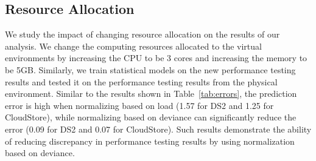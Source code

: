 \begin{comment}
\begin{table}[tbh]
	\centering
	\caption{Discrepancy vs. Change in Virtual Environment}
	\label{my-label}
	\resizebox{\columnwidth}{!}{%
		\begin{tabular}{|c||c|c|}
			\hline
			\multirow{2}{*}{\textbf{Type}} & \multicolumn{2}{c|}{\textbf{MAPE}} \\ \cline{2-3} 
			& \textbf{CloudStore} & \textbf{DS2} \\ %
			\midrule
			\midrule
			Internal validation & 3.65\% & 10.52\% \\ \hline
			External validation with virtual repeated test \# 1 & 6.04\% & 11.69\% \\ \hline
			External validation with virtual repeated test \# 2 & 5.43\% & 15.48\% \\ \hline
			VMWare & 10.18\% & 12.89\% \\ \hline
			Change in resources & 25.81\% & 84.36\% \\ \hline
		\end{tabular}%
	}
\end{table}
\end{comment}


\subsection{Resource Allocation}

We study the impact of changing resource allocation on the results of our analysis. We change the computing resources allocated to the virtual environments by increasing the CPU to be 3 cores and increasing the memory to be 5GB. Similarly, we train statistical models on the new performance testing results and tested it on the performance testing results from the physical environment. Similar to the results shown in Table~\ref{tab:errors}, the prediction error is high when normalizing based on load (1.57 for DS2 and 1.25 for CloudStore), while normalizing based on deviance can significantly reduce the error (0.09 for DS2 and 0.07 for CloudStore). Such results demonstrate the ability of reducing discrepancy in performance testing results by using normalization based on deviance.




